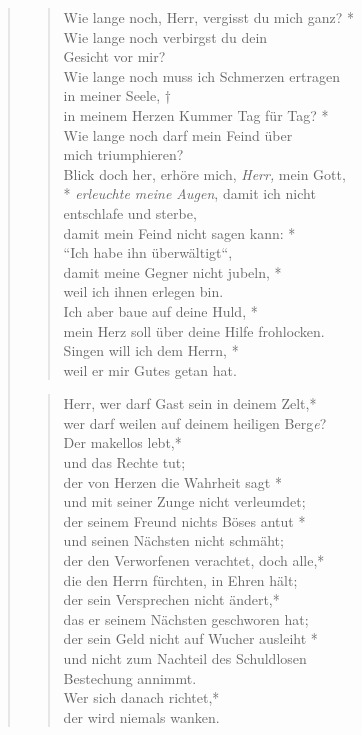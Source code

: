 \begin{quote}
\begin{verse}
\smallskip
 Wie lange noch, Herr, vergisst du mich ganz? *\\
Wie lange noch verbirgst du dein \\Gesicht vor mir?\\ \vin
Wie lange noch muss ich Schmerzen ertragen \\  \vin in meiner Seele, †\\ \vin
in meinem Herzen Kummer Tag für Tag? *\\ \vin 
Wie lange noch darf mein Feind über \\ \vin mich triumphieren?\\
Blick doch her, erhöre mich, \textit{Herr,} mein Gott,\\ *
\textit{erleuchte meine Augen}, damit ich nicht \\ entschlafe und sterbe,\\ \vin
damit mein Feind nicht sagen kann: *   \\ \vin ``Ich habe ihn überwältigt``,\\
damit meine Gegner nicht jubeln, *\\weil ich ihnen  erlegen bin.\\
\vin Ich aber baue auf deine Huld, *\\ \vin
mein Herz soll über deine Hilfe frohlocken.\\ 
Singen will ich dem Herrn, *\\weil er mir  Gutes getan hat.\\
\end{verse}

\newpage

\begin{verse}


\smallskip
 Herr, wer darf Gast sein in deinem Zelt,*\\
wer darf weilen auf deinem heiligen Berg\textit{e}?\\ \vin
Der makellos lebt,*\\ \vin
und das Rechte tut;\\
der von Herzen die Wahrheit sagt  *\\
und mit seiner Zunge nicht verleumdet;\\ \vin
der seinem Freund nichts Böses antut *\\ \vin
und seinen Nächsten nicht schmäht;\\
der den Verworfenen verachtet, doch alle,*\\
die den Herrn fürchten, in Ehren hält;\\ \vin
der sein Versprechen nicht ändert,*\\ \vin
das er seinem Nächsten geschworen hat;\\
der sein Geld nicht auf Wucher ausleiht *\\
und nicht zum Nachteil des Schuldlosen\\ Bestechung annimmt.\\ \vin
Wer sich danach richtet,*\\ \vin
der wird niemals wanken.\\
\end{verse}


\end{quote}